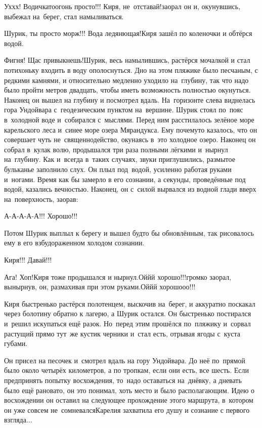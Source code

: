 \diagdash Ух\sdash х\sdash х! Водичка\sdash то\mdash огонь просто!!! Киря, не~отставай!\mdash заорал он и, окунувшись, выбежал на~берег, стал намыливаться.

\diagdash Шурик, ты просто морж!!! Вода ледянющая!\mdash Киря зашёл по коленочки и обтёрся водой.

\diagdash Фигня! Щас привыкнешь!\mdash Шурик, весь намылившись, растёрся мочалкой и стал потихоньку входить в воду ополоснуться. Дно на этом пляжике было песчаным, с редкими камнями, и относительно медленно уходило на~глубину, так что надо было пройти метров двадцать, чтобы иметь возможность полностью окунуться. Наконец он вышел на глубину и посмотрел вдаль. На~горизонте слева виднелась гора Ундойвара с~геодезическим пунктом на~вершине.  Шурик стоял по~пояс в~холодной воде и~собирался с~мыслями. Перед ним расстилалось зелёное море карельского леса и~синее море озера Мярандукса. Ему почему\sdash то казалось, что он совершает чуть не~священнодейство, окунаясь в~это холодное озеро. Наконец он собрал в~кулак волю, продышался три раза полными лёгкими и~нырнул на~глубину. Как и~всегда в~таких случаях, звуки приглушились, размытое бульканье заполнило слух. Он плыл под~водой, усиленно работая руками и~ногами. Время как бы замерло в его сознании, а секунды, проведённые под водой, казались вечностью. Наконец, он с~силой вырвался из водной глади вверх на~поверхность, заорав:

\diagdash А-А-А-А-А!!! Хорошо!!!
\nopagebreak

Потом Шурик выплыл к берегу и вышел будто бы обновлённым, так рисовалось ему в его взбудораженном холодом сознании.

\diagdash Киря!!! Давай!!! 

\diagdash Ага! Хоп!\mdash Киря тоже продышался и нырнул.\mdash Ой\sdash й\sdash й хорошо!!!\mdash громко заорал, вынырнув, он, размахивая при этом руками.\mdash Ой\sdash й\sdash й хорошо\sdash о\sdash о!!!

Киря быстренько растёрся полотенцем, выскочив на~берег, и аккуратно поскакал через болотину обратно к лагерю, а Шурик остался. Он быстренько постирался и~решил искупаться ещё разок. Но~перед этим прошёлся по~пляжику и~сорвал растущий прямо тут~же кустик черники и~стал есть, отрывая ягоды с~куста губами. 

Он присел на песочек и~смотрел вдаль на гору Ундойвара. До неё по~прямой было около четырёх километров, а по тропкам, если они есть, все шесть. Если предпринять попытку восхождения, то~надо оставаться на~днёвку, а дневать было ещё рановато, он это понимал, хоть место и было располагающим. Идею о восхождении он оставил на следующее прохождение этого маршрута, в~котором он уже совсем не~сомневался\mdash Карелия захватила его душу и сознание с первого взгляда$\ldots$ 

